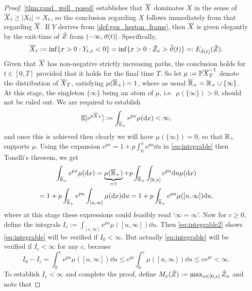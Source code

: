 \begin{proof}
    \autoref{thm:rand_well_posed} establishes that ${\overline{X}}$ dominates $X$ in the sense of ${\overline{X}}_t\ge|X_t|=X_t$, so the conclusion regarding $X$ follows immediately from that regarding ${\overline{X}}$. If $Y$ derives from \autoref{def:gen_heston_frame}, then ${\overline{X}}$ is given elegantly by the exit-time of $\tilde{Z}$ from $(-\infty,\vartheta(t)]$. Specifically,~
    \begin{equation}\label{eq:bound_rep}
        {\overline{X}}_t := \inf\{x>0:Y_{t,x}<0\} = \inf\{x>0:\tilde{Z}_x > \tilde{\vartheta}(t)\} =: E_{\tilde{\vartheta}(t)}(\tilde{Z}).
    \end{equation}
    Given that ${\overline{X}}$ has non-negative strictly increasing paths, the conclusion holds for $t\in[0,T]$ provided that it holds for the final time $T$. So let $\mu:=\mathbb{P} {\overline{X}}_T^{-1}$ denote the distribution of ${\overline{X}}_T$, satisfying $\mu({\overline{\mathbb{R}}}_+)=1$, where as usual ${\overline{\mathbb{R}}}_+=\mathbb{R}_+\cup\{\infty\}$. At this stage, the singleton $\{\infty\}$ being an atom of $\mu$, i.e.~$\mu(\{\infty\})>0$, should not be ruled out. We are required to establish
    \begin{equation}\label{eq:integrable}
        \mathbb{E}[e^{p{\overline{X}}_T}] := \int_{{\overline{\mathbb{R}}}_+}e^{px}\mu(\mathrm{d} x) <\infty,
    \end{equation}
    and once this is achieved then clearly we will have $\mu(\{\infty\})=0$, so that $\mathbb{R}_+$ supports $\mu$. Using the expansion $e^{px} = 1 + p\int_0^x e^{pu}\dd u$ in \autoref{eq:integrable} then Tonelli's theorem, we get
    \begin{multline}\label{eq:integrable2}
        \int_{{\overline{\mathbb{R}}}_+}e^{px}\mu(\mathrm{d} x) = \underbrace{\mu({\overline{\mathbb{R}}}_+)}_{=1} + p\int_{{\overline{\mathbb{R}}}_+}\int_{[0,x]} e^{pu}\mathrm{d} u\mu(\mathrm{d} x)\\ = 1 + p\int_{{\overline{\mathbb{R}}}_+} e^{pu}\int_{[u,\infty]} \mu(\mathrm{d} x)\mathrm{d} u = 1 + p\int_{{\overline{\mathbb{R}}}_+} e^{pu}\mu([u,\infty])\mathrm{d} u,
    \end{multline}
    where at this stage these expressions could feasibly read `$\infty=\infty$'. Now for $c\ge0$, define the integrals $I_c:=\int_{[c,\infty]} e^{pu}\mu([u,\infty])\dd u$. Then \autoref{eq:integrable2} shows \autoref{eq:integrable} will be verified if $I_0<\infty$. But actually \autoref{eq:integrable} will be verified if $I_c <\infty$ for any $c$, because
    \begin{equation}
        I_0 - I_c = \int_0^c e^{pu}\mu([u,\infty])\dd u \le e^{pc}\int_0^c \mu([u,\infty])\dd u \le ce^{pc} < \infty.
    \end{equation}
    To establish $I_c<\infty$ and complete the proof, define $M_x(\tilde{Z}):=\max_{u\in[0,x]}\tilde{Z}_u$ and note that

\end{proof}
